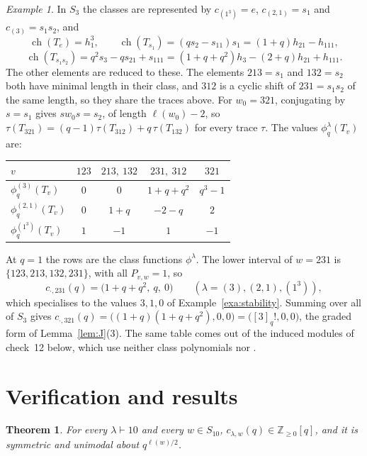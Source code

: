 \documentclass[11pt]{amsart}
\newtheorem{theorem}{Theorem}[section]
\theoremstyle{definition}
\theoremstyle{remark}
\newtheorem{exa}{Example}[section]
\newcommand{\Z}{\mathbb{Z}}
\DeclareMathOperator{\ch}{ch}
\begin{document}
\begin{exa}\label{exa:traces}
In $S_3$ the classes are represented by $c_{(1^3)}=e$, $c_{(2,1)}=s_1$ and $c_{(3)}=s_1s_2$, and
\[
\ch(T_e)=h_1^3,\qquad \ch(T_{s_1})=(qs_2-s_{11})s_1=(1+q)h_{21}-h_{111},
\]
\[
\ch(T_{s_1s_2})=q^2s_3-qs_{21}+s_{111}=(1+q+q^2)h_3-(2+q)h_{21}+h_{111}.
\]
The other elements are reduced to these. The elements $213=s_1$ and $132=s_2$ both have minimal length in their class, and $312$ is a cyclic shift of $231=s_1s_2$ of the same length, so they share the traces above. For $w_0=321$, conjugating by $s=s_1$ gives $sw_0s=s_2$, of length $\ell(w_0)-2$, so $\tau(T_{321})=(q-1)\tau(T_{312})+q\,\tau(T_{132})$ for every trace $\tau$. The values $\phi^\lambda_q(T_v)$ are:
\begin{center}
\small
\begin{tabular}{lcccc}
\toprule
$v$ & $123$ & $213,\ 132$ & $231,\ 312$ & $321$\\
\midrule
$\phi^{(3)}_q(T_v)$ & $0$ & $0$ & $1+q+q^2$ & $q^3-1$\\
$\phi^{(2,1)}_q(T_v)$ & $0$ & $1+q$ & $-2-q$ & $2$\\
$\phi^{(1^3)}_q(T_v)$ & $1$ & $-1$ & $1$ & $-1$\\
\bottomrule
\end{tabular}
\end{center}
At $q=1$ the rows are the class functions $\phi^\lambda$. The lower interval of $w=231$ is $\{123,213,132,231\}$, with all $P_{v,w}=1$, so
\[
c_{\cdot,231}(q)=\bigl(1+q+q^2,\ q,\ 0\bigr)\qquad(\lambda=(3),(2,1),(1^3)),
\]
which specialises to the values $3,1,0$ of Example~\ref{exa:stability}. Summing over all of $S_3$ gives $c_{\cdot,321}(q)=\bigl((1+q)(1+q+q^2),0,0\bigr)=\bigl([3]_q!,0,0\bigr)$, the graded form of Lemma~\ref{lem:J}(3). The same table comes out of the induced modules of check~12 below, which use neither class polynomials nor \cite{Ram}.
\end{exa}

\section{Verification and results}\label{sec:checks}

\begin{theorem}\label{thm:n10}
For every $\lambda\vdash 10$ and every $w\in S_{10}$, $c_{\lambda,w}(q)\in\Z_{\ge0}[q]$, and it is symmetric and unimodal about $q^{\ell(w)/2}$.
\end{theorem}
\end{document}
